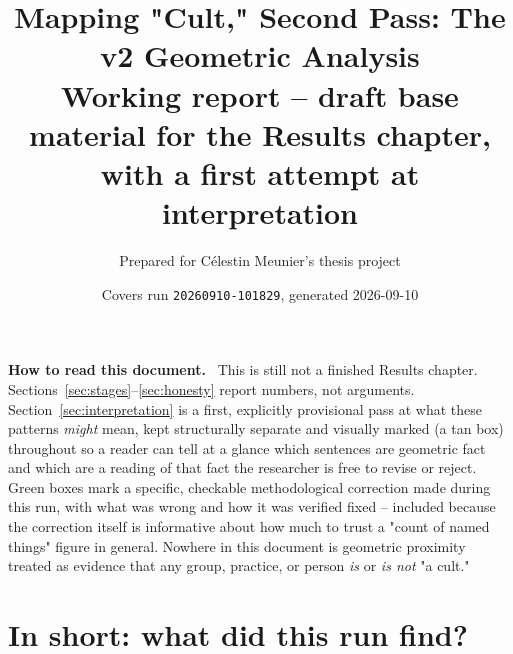 \documentclass[11pt,a4paper]{article}
\title{\textbf{Mapping "Cult," Second Pass: The v2 Geometric Analysis}\\[4pt]
\large Working report -- draft base material for the Results chapter,\\
with a first attempt at interpretation}
\author{Prepared for C\'elestin Meunier's thesis project}
\date{Covers run \texttt{20260910-101829}, generated 2026-09-10}
\newenvironment{plainbox}[1][Note]
  {\par\vspace{6pt}\noindent{\color{noteline}\rule{\linewidth}{0.6pt}}\par\vspace{3pt}
   \noindent\small\textbf{#1.}\ \ignorespaces}
  {\par\vspace{3pt}\noindent{\color{noteline}\rule{\linewidth}{0.6pt}}\vspace{6pt}\par}
\begin{document}
\maketitle

\begin{plainbox}[How to read this document]
This is still not a finished Results chapter. Sections~\ref{sec:stages}--\ref{sec:honesty}
report numbers, not arguments. Section~\ref{sec:interpretation} is a first,
explicitly provisional pass at what these patterns \emph{might} mean, kept
structurally separate and visually marked (a tan box) throughout so a
reader can tell at a glance which sentences are geometric fact and which
are a reading of that fact the researcher is free to revise or reject.
Green boxes mark a specific, checkable methodological correction made
during this run, with what was wrong and how it was verified fixed --
included because the correction itself is informative about how much to
trust a "count of named things" figure in general. Nowhere in this
document is geometric proximity treated as evidence that any group,
practice, or person \emph{is} or \emph{is not} "a cult."
\end{plainbox}

\tableofcontents

\section{In short: what did this run find?}
\label{sec:short}
\end{document}

